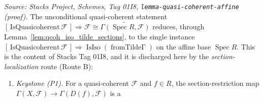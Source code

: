 \begin{remark}
  \label{rem:o1i8_decomposition}
  \textit{Source: Stacks Project, Schemes, Tag 01I8, \texttt{lemma-quasi-coherent-affine}
  (proof).}
  The unconditional quasi-coherent statement
  \([{\,}\mathrm{IsQuasicoherent}\,\mathcal{F}{\,}] \Rightarrow \mathcal{F} \cong
  \widetilde{\Gamma(\operatorname{Spec} R, \mathcal{F})}\) reduces, through
  Lemma~\ref{lem:qcoh_iso_tilde_sections}, to the single instance
  \([{\,}\mathrm{IsQuasicoherent}\,\mathcal{F}{\,}] \Rightarrow
  \operatorname{IsIso}(\operatorname{fromTilde\Gamma})\) on the affine base \(\operatorname{Spec} R\).
  This is the content of Stacks Tag 01I8, and it is discharged here by the
  \emph{section-localization} route (Route B):
  \begin{enumerate}
  \item \emph{Keystone (P1).} For a quasi-coherent \(\mathcal{F}\) and \(f \in R\), the
    section-restriction map \(\Gamma(X, \mathcal{F}) \to \Gamma(D(f), \mathcal{F})\) is a

\end{enumerate}
\end{remark}

